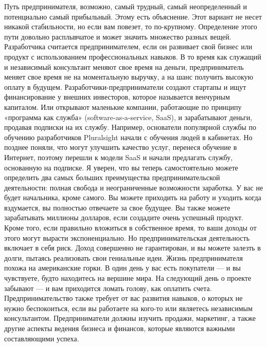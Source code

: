 \documentclass{../industrial-development}
\begin{document}
\lecturenotes
Путь предпринимателя, возможно, самый трудный, самый неопределенный и потенциально самый прибыльный. Этому есть объяснение. Этот вариант не несет никакой стабильности, но если вам повезет, то по-крупному.
Определение этого пути довольно расплывчатое и может значить множество разных вещей. Разработчика считается предпринимателем, если он развивает свой бизнес или продукт с использованием профессиональных навыков. В то время как служащий и независимый консультант меняют свое время на деньги, предприниматель меняет свое время не на моментальную выручку, а на шанс получить высокую оплату в будущем.
Разработчики-предприниматели создают стартапы и ищут финансирование у внешних инвесторов, которое называется венчурным капиталом. Или открывают маленькие компании, работающие по принципу «программа как служба» (software-as-a-service, SaaS), и зарабатывают деньги, продавая подписки на их службу. Например, основатели популярной службы по обучению разработчиков Pluralsight начали с обучения людей в кабинетах. Но позднее поняли, что могут улучшить качество услуг, перенеся обучение в Интернет, поэтому перешли к модели SaaS и начали предлагать службу, основанную на подписке.
Я уверен, что вы теперь самостоятельно можете определить два самых больших преимущества предпринимательской деятельности: полная свобода и неограниченные возможности заработка. У вас не будет начальника, кроме самого. Вы можете приходить на работу и уходить когда вздумается, вы полностью отвечаете за свое будущее. Вы также можете зарабатывать миллионы долларов, если создадите очень успешный продукт. Кроме того, если правильно вложиться в собственное время, то ваши доходы от этого могут вырасти экспоненциально.
Но предпринимательская деятельность включает в себя риск. Доход совершенно не гарантирован, и вы можете залезть в долги, пытаясь реализовать свои гениальные идеи. Жизнь предпринимателя похожа на американские горки. В один день у вас есть покупатели — и вы чувствуете, будто находитесь на вершине мира. На следующий день о проекте забывают — и вам приходится ломать голову, как оплатить счета.
Предпринимательство также требует от вас развития навыков, о которых не нужно беспокоиться, если вы работаете на кого-то или являетесь независимым консультантом. Предприниматели должны изучить продажи, маркетинг, а также другие аспекты ведения бизнеса и финансов, которые являются важными составляющими успеха. 

\end{document}
